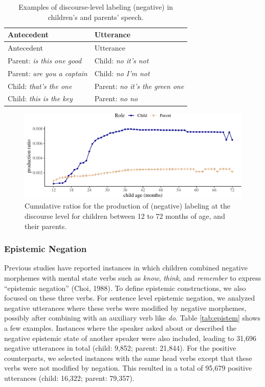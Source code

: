 \documentclass[
  english,
  man,floatsintext]{apa6}
\begin{document}
\begin{longtable}[]{@{}ll@{}}
\caption{\label{tab:dislabel} Examples of discourse-level labeling (negative) in children's and parents' speech.}\tabularnewline
\toprule
Antecedent & Utterance \\
\midrule
\endfirsthead
\toprule
Antecedent & Utterance \\
\midrule
\endhead
Parent: \emph{is this one good} & Child: \emph{no it's not} \\
Parent: \emph{are you a captain} & Child: \emph{no I'm not} \\
Child: \emph{that's the one} & Parent: \emph{no it's the green one} \\
Child: \emph{this is the key} & Parent: \emph{no no} \\
\bottomrule
\end{longtable}

\begin{figure}[H]

{\centering \includegraphics{neg_construction_article_files/figure-latex/learningdiscourse-1} 

}

\caption{Cumulative ratios for the production of (negative) labeling at the discourse level for children between 12 to 72 months of age, and their parents.}\label{fig:learningdiscourse}
\end{figure}

\hypertarget{epistemic-negation}{%
\subsubsection{Epistemic Negation}\label{epistemic-negation}}

Previous studies have reported instances in which children combined negative morphemes with mental state verbs such as \emph{know}, \emph{think}, and \emph{remember} to express ``epistemic negation'' (Choi, 1988). To define epistemic constructions, we also focused on these three verbs. For sentence level epistemic negation, we analyzed negative utterances where these verbs were modified by negative morphemes, possibly after combining with an auxiliary verb like \emph{do}. Table \ref{tab:epistem} shows a few examples. Instances where the speaker asked about or described the negative epistemic state of another speaker were also included, leading to 31,696 negative utterances in total (child: 9,852; parent: 21,844). For the positive counterparts, we selected instances with the same head verbs except that these verbs were not modified by negation. This resulted in a total of 95,679 positive utterances (child: 16,322; parent: 79,357).
\end{document}
